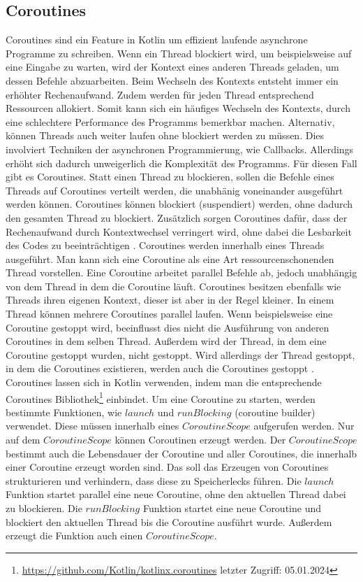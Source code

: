 \documentclass{article}
\begin{document}
\subsection{Coroutines}
Coroutines sind ein Feature in Kotlin um effizient laufende asynchrone Programme zu schreiben. Wenn ein Thread blockiert wird, um beispielsweise auf eine Eingabe zu warten, wird der Kontext eines anderen Threads geladen, um dessen Befehle abzuarbeiten. Beim Wechseln des Kontexts entsteht immer ein erhöhter Rechenaufwand. Zudem werden für jeden Thread entsprechend Ressourcen allokiert. Somit kann sich ein häufiges Wechseln des Kontexts, durch eine schlechtere Performance des Programms bemerkbar machen. Alternativ, können Threads auch weiter laufen ohne blockiert werden zu müssen. Dies involviert Techniken der asynchronen Programmierung, wie Callbacks. Allerdings erhöht sich dadurch unweigerlich die Komplexität des Programms. Für diesen Fall gibt es Coroutines. Statt einen Thread zu blockieren, sollen die Befehle eines Threads auf Coroutines verteilt werden, die unabhänig voneinander ausgeführt werden können. Coroutines können blockiert (suspendiert) werden, ohne dadurch den gesamten Thread zu blockiert. Zusätzlich sorgen Coroutines dafür, dass der Rechenaufwand durch Kontextwechsel verringert wird, ohne dabei die Lesbarkeit des Codes zu beeinträchtigen \cite{Kotlin_In-D}. \newline
Coroutines werden innerhalb eines Threads ausgeführt. Man kann sich eine Coroutine als eine Art ressourcenschonenden Thread vorstellen. Eine Coroutine arbeitet parallel Befehle ab, jedoch unabhängig von dem Thread in dem die Coroutine läuft. Coroutines besitzen ebenfalls wie Threads ihren eigenen Kontext, dieser ist aber in der Regel kleiner. In einem Thread können mehrere Coroutines parallel laufen. Wenn beispielsweise eine Coroutine gestoppt wird, beeinflusst dies nicht die Ausführung von anderen Coroutines in dem selben Thread. Außerdem  wird der Thread, in dem eine Coroutine gestoppt wurden, nicht gestoppt. Wird allerdings der Thread gestoppt, in dem die Coroutines existieren, werden auch die Coroutines gestoppt \cite{KotlinLangDocCoroutines}. \newline
Coroutines lassen sich in Kotlin verwenden, indem man die entsprechende Coroutines Bibliothek\footnote{\url{https://github.com/Kotlin/kotlinx.coroutines} letzter Zugriff: 05.01.2024} einbindet.  Um eine Coroutine zu starten, werden bestimmte Funktionen, wie $launch$ und $runBlocking$ (coroutine builder) verwendet. Diese müssen innerhalb eines $CoroutineScope$ aufgerufen werden. Nur auf dem $CoroutineScope$ können Coroutinen erzeugt werden. Der $CoroutineScope$ bestimmt auch die Lebensdauer der Coroutine und aller Coroutines, die innerhalb einer Coroutine erzeugt worden sind.  Das soll das Erzeugen von Coroutines strukturieren und verhindern, dass diese zu Speicherlecks führen.  Die $launch$ Funktion startet parallel eine neue Coroutine, ohne den aktuellen Thread dabei zu blockieren. Die $runBlocking$ Funktion startet eine neue Coroutine und blockiert den aktuellen Thread bis die Coroutine ausführt wurde. Außerdem erzeugt die Funktion auch einen $CoroutineScope$.
\end{document}
